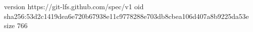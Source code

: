 version https://git-lfs.github.com/spec/v1
oid sha256:53d2c1419dea6e720b67938e11c9778288e703db8cbea106d407a8b9225da53e
size 766
